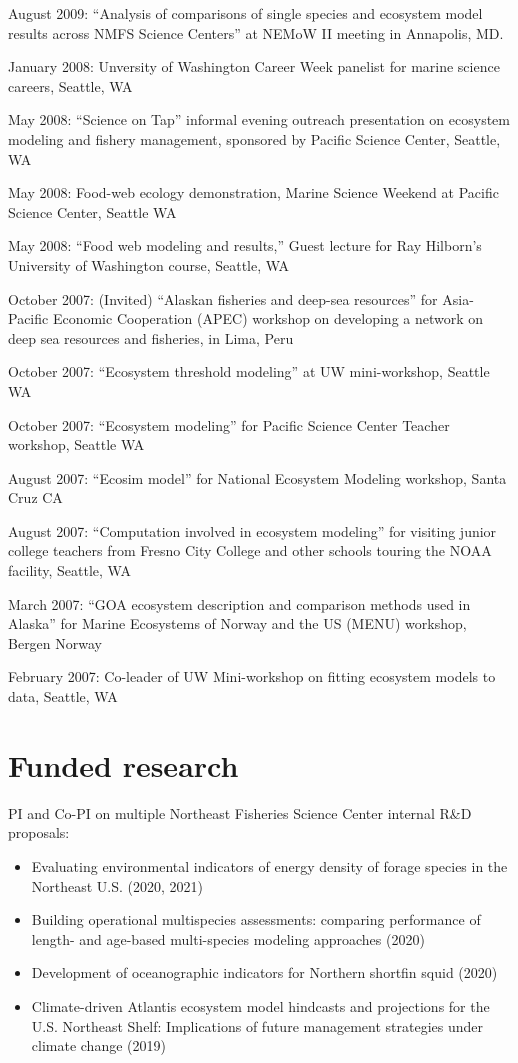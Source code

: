 \documentclass[11pt, a4paper]{awesome-cv}
\begin{document}
August 2009: ``Analysis of comparisons of single species and ecosystem
model results across NMFS Science Centers'' at NEMoW II meeting in
Annapolis, MD.

January 2008: Unversity of Washington Career Week panelist for marine
science careers, Seattle, WA

May 2008: ``Science on Tap'' informal evening outreach presentation on
ecosystem modeling and fishery management, sponsored by Pacific Science
Center, Seattle, WA

May 2008: Food-web ecology demonstration, Marine Science Weekend at
Pacific Science Center, Seattle WA

May 2008: ``Food web modeling and results,'' Guest lecture for Ray
Hilborn's University of Washington course, Seattle, WA

October 2007: (Invited) ``Alaskan fisheries and deep-sea resources'' for
Asia-Pacific Economic Cooperation (APEC) workshop on developing a
network on deep sea resources and fisheries, in Lima, Peru

October 2007: ``Ecosystem threshold modeling'' at UW mini-workshop,
Seattle WA

October 2007: ``Ecosystem modeling'' for Pacific Science Center Teacher
workshop, Seattle WA

August 2007: ``Ecosim model'' for National Ecosystem Modeling workshop,
Santa Cruz CA

August 2007: ``Computation involved in ecosystem modeling'' for visiting
junior college teachers from Fresno City College and other schools
touring the NOAA facility, Seattle, WA

March 2007: ``GOA ecosystem description and comparison methods used in
Alaska'' for Marine Ecosystems of Norway and the US (MENU) workshop,
Bergen Norway

February 2007: Co-leader of UW Mini-workshop on fitting ecosystem models
to data, Seattle, WA

\hypertarget{funded-research}{%
\section{Funded research}\label{funded-research}}

PI and Co-PI on multiple Northeast Fisheries Science Center internal
R\&D proposals:

\begin{itemize}
\item
  Evaluating environmental indicators of energy density of forage
  species in the Northeast U.S. (2020, 2021)
\item
  Building operational multispecies assessments: comparing performance
  of length- and age-based multi-species modeling approaches (2020)
\item
  Development of oceanographic indicators for Northern shortfin squid
  (2020)
\item
  Climate-driven Atlantis ecosystem model hindcasts and projections for
  the U.S. Northeast Shelf: Implications of future management strategies
  under climate change (2019)
\end{itemize}
\end{document}
